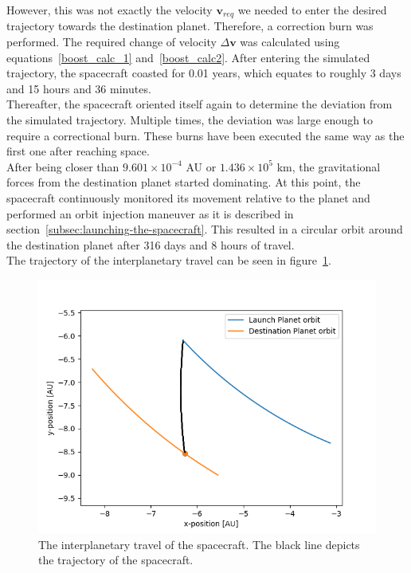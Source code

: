 \documentclass[reprint,english,notitlepage]{revtex4-2}
\begin{document}
    However, this was not exactly the velocity $\textbf{v}_{req}$ we needed to enter the desired trajectory towards the destination planet.
    Therefore, a correction burn was performed.
    The required change of velocity $\Delta\textbf{v}$ was calculated using equations~\eqref{boost_calc_1} and~\eqref{boost_calc2}.
    After entering the simulated trajectory, the spacecraft coasted for 0.01 years, which equates to roughly 3 days and 15 hours and 36 minutes.\\
    Thereafter, the spacecraft oriented itself again to determine the deviation from the simulated trajectory.
    Multiple times, the deviation was large enough to require a correctional burn.
    These burns have been executed the same way as the first one after reaching space.\\
    After being closer than $9.601 \times 10^{-4}$ AU or $1.436 \times 10^5$ km, the gravitational forces from the destination planet started dominating.
    At this point, the spacecraft continuously monitored its movement relative to the planet and performed an orbit injection maneuver as it is described in section~\ref{subsec:launching-the-spacecraft}.
    This resulted in a circular orbit around the destination planet after 316 days and 8 hours of travel.\\
    The trajectory of the interplanetary travel can be seen in figure~\ref{fig:inter_trav}.
    \begin{figure}[h]
        \centering
        \includegraphics[scale=0.35]{Figures/inter_trav}
        \caption{The interplanetary travel of the spacecraft. The black line depicts the trajectory of the spacecraft.}\label{fig:inter_trav}
    \end{figure}
\end{document}
